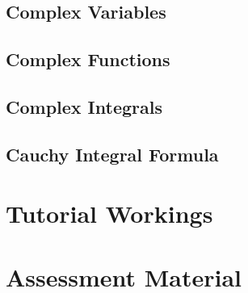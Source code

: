 \documentclass[fleqn, 10pt, titlepage, twoside]{report}
\begin{document}
 \chapter{Complex Variables}
 
 
 \chapter{Complex Functions}
 

 \chapter{Complex Integrals}
 
%
 \chapter{Cauchy Integral Formula}
 
%


\part{Tutorial Workings}

%

\part{Assessment Material}
\begin{appendix}
  \listoftables
  \listoffigures
\end{appendix}
\end{document}
